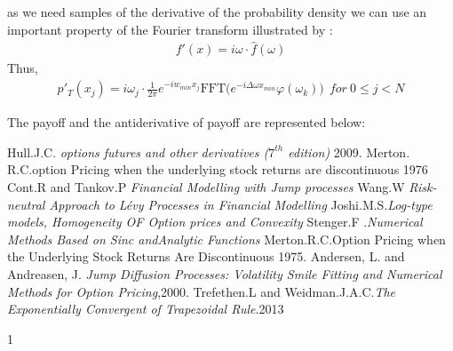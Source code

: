 \documentclass[12pt]{report}
\begin{document}
as we need samples of the derivative of the probability density we can use an important property of the Fourier transform illustrated by :
\begin{gather*}
f'(x)= i \omega \cdot \hat{f}(\omega)
\end{gather*}
Thus, 
\begin{gather}
p'_T(x_j)= i \omega_j \cdot   \frac{1}{2 \pi} e^{- iw_{min} x_j} \text{FFT}\big ( e^{-i \Delta\omega x_{min} } \varphi(\omega_k) \big) ~~for~ 0 \leqslant j < N
\end{gather}

The payoff and the antiderivative of payoff are represented below:

 \begin{thebibliography}{1}
 
   Hull.J.C. {\em options futures and other derivatives ($7^{th}$ edition)}  2009.
Merton. R.C.{option Pricing when the underlying stock returns are discontinuous} 1976
Cont.R and Tankov.P {\em Financial Modelling with Jump processes}
 Wang.W {\em Risk-neutral Approach to
Lévy Processes in Financial Modelling}
 Joshi.M.S.{\em Log-type models, Homogeneity OF Option prices and Convexity}
 Stenger.F .{\em Numerical Methods
Based on Sinc andAnalytic Functions}
 Merton.R.C.{Option Pricing when the Underlying Stock Returns Are Discontinuous} 1975.
  Andersen, L. and Andreasen, J. {\em Jump Diffusion Processes: Volatility Smile Fitting
and Numerical Methods for Option Pricing},2000.
 Trefethen.L and Weidman.J.A.C.{\em The Exponentially  Convergent  of Trapezoidal  Rule}.2013
 \end{thebibliography}{1}


 
\end{document}
